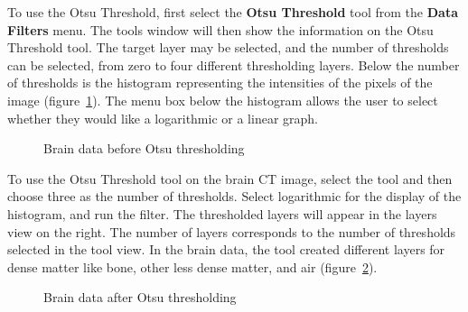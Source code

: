 \documentclass[fleqn,11pt,openany]{book}
\begin{document}
To use the Otsu Threshold, first select the {\bf Otsu Threshold} tool from the {\bf Data Filters} menu. The tools window will then show the information on the Otsu Threshold tool. The target layer may be selected, and the number of thresholds can be selected, from zero to four different thresholding layers. Below the number of thresholds is the histogram representing the intensities of the pixels of the image (figure~\ref{fig:OtsuBefore}). The menu box below the histogram allows the user to select whether they would like a logarithmic or a linear graph.

\begin{figure}
\caption{Brain data before Otsu thresholding}\label{fig:OtsuBefore}
\end{figure}

To use the Otsu Threshold tool on the brain CT image, select the tool and then choose three as the number of thresholds. Select logarithmic for the display of the histogram, and run the filter. The thresholded layers will appear in the layers view on the right. The number of layers corresponds to the number of thresholds selected in the tool view. In the brain data, the tool created different layers for dense matter like bone, other less dense matter, and air (figure~\ref{fig:OtsuAfter}).

\begin{figure}
\caption{Brain data after Otsu thresholding}\label{fig:OtsuAfter}
\end{figure}
\end{document}
